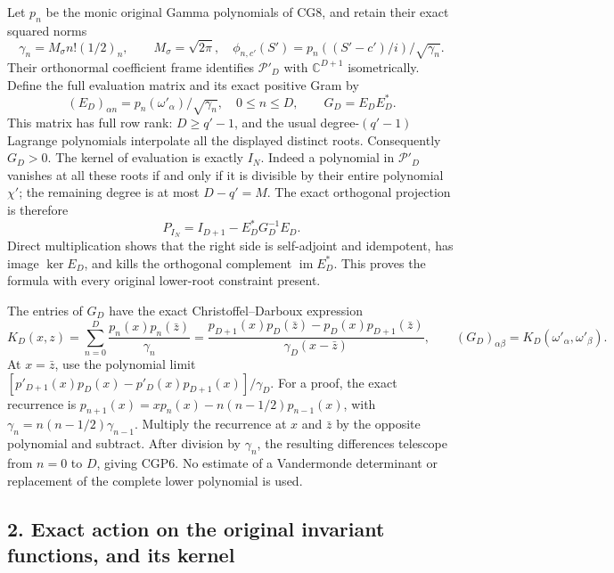 Let \(p_n\) be the monic original Gamma polynomials of CG8, and retain their exact squared norms \[
\gamma_n=M_\sigma n!(1/2)_n,\qquad M_\sigma=\sqrt{2\pi},
\quad \phi_{n,c'}(S')=p_n((S'-c')/i)/\sqrt{\gamma_n}.
\tag{CGP3}
\] Their orthonormal coefficient frame identifies \(\mathcal P'_D\) with \(\mathbb C^{D+1}\) isometrically. Define the full evaluation matrix and its exact positive Gram by \[
(E_D)_{\alpha n}=p_n(\omega'_\alpha)/\sqrt{\gamma_n},
\quad 0\le n\le D,\qquad G_D=E_DE_D^*.
\tag{CGP4}
\] This matrix has full row rank: \(D\ge q'-1\), and the usual degree-\((q'-1)\) Lagrange polynomials interpolate all the displayed distinct roots. Consequently \(G_D>0\). The kernel of evaluation is exactly \(I_N\). Indeed a polynomial in \(\mathcal P'_D\) vanishes at all these roots if and only if it is divisible by their entire polynomial \(\chi'\); the remaining degree is at most \(D-q'=M\). The exact orthogonal projection is therefore \[
\boxed{P_{I_N}=I_{D+1}-E_D^*G_D^{-1}E_D.}
\tag{CGP5}
\] Direct multiplication shows that the right side is self-adjoint and idempotent, has image \(\ker E_D\), and kills the orthogonal complement \(\operatorname{im}E_D^*\). This proves the formula with every original lower-root constraint present.

The entries of \(G_D\) have the exact Christoffel--Darboux expression \[
K_D(x,z)=\sum_{n=0}^D\frac{p_n(x)p_n(\bar z)}{\gamma_n}
=\frac{p_{D+1}(x)p_D(\bar z)-p_D(x)p_{D+1}(\bar z)}
{\gamma_D(x-\bar z)},\qquad
(G_D)_{\alpha\beta}=K_D(\omega'_\alpha,\omega'_\beta).
\tag{CGP6}
\] At \(x=\bar z\), use the polynomial limit \([p'_{D+1}(x)p_D(x)-p'_D(x)p_{D+1}(x)]/\gamma_D\). For a proof, the exact recurrence is \(p_{n+1}(x)=xp_n(x)-n(n-1/2)p_{n-1}(x)\), with \(\gamma_n=n(n-1/2)\gamma_{n-1}\). Multiply the recurrence at \(x\) and \(\bar z\) by the opposite polynomial and subtract. After division by \(\gamma_n\), the resulting differences telescope from \(n=0\) to \(D\), giving CGP6. No estimate of a Vandermonde determinant or replacement of the complete lower polynomial is used.

\subsection{2. Exact action on the original invariant functions, and its kernel}\label{exact-action-on-the-original-invariant-functions-and-its-kernel}


